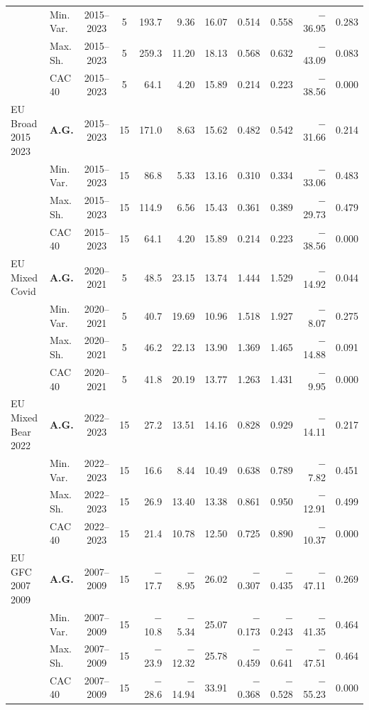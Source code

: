 \begin{longtable}{p{2.6cm} l c c r r r r r r r}
 & Min.\,Var. & 2015--2023 & 5 & 193.7 & 9.36 & 16.07 & 0.514 & 0.558 & $-$36.95 & 0.283 \\
 & Max.\,Sh. & 2015--2023 & 5 & 259.3 & 11.20 & 18.13 & 0.568 & 0.632 & $-$43.09 & 0.083 \\
 & CAC 40 & 2015--2023 & 5 & 64.1 & 4.20 & 15.89 & 0.214 & 0.223 & $-$38.56 & 0.000 \\
\midrule
EU Broad 2015 2023 & \textbf{A.G.} & 2015--2023 & 15 & 171.0 & 8.63 & 15.62 & 0.482 & 0.542 & $-$31.66 & 0.214 \\
 & Min.\,Var. & 2015--2023 & 15 & 86.8 & 5.33 & 13.16 & 0.310 & 0.334 & $-$33.06 & 0.483 \\
 & Max.\,Sh. & 2015--2023 & 15 & 114.9 & 6.56 & 15.43 & 0.361 & 0.389 & $-$29.73 & 0.479 \\
 & CAC 40 & 2015--2023 & 15 & 64.1 & 4.20 & 15.89 & 0.214 & 0.223 & $-$38.56 & 0.000 \\
\midrule
EU Mixed Covid & \textbf{A.G.} & 2020--2021 & 5 & 48.5 & 23.15 & 13.74 & 1.444 & 1.529 & $-$14.92 & 0.044 \\
 & Min.\,Var. & 2020--2021 & 5 & 40.7 & 19.69 & 10.96 & 1.518 & 1.927 & $-$8.07 & 0.275 \\
 & Max.\,Sh. & 2020--2021 & 5 & 46.2 & 22.13 & 13.90 & 1.369 & 1.465 & $-$14.88 & 0.091 \\
 & CAC 40 & 2020--2021 & 5 & 41.8 & 20.19 & 13.77 & 1.263 & 1.431 & $-$9.95 & 0.000 \\
\midrule
EU Mixed Bear 2022 & \textbf{A.G.} & 2022--2023 & 15 & 27.2 & 13.51 & 14.16 & 0.828 & 0.929 & $-$14.11 & 0.217 \\
 & Min.\,Var. & 2022--2023 & 15 & 16.6 & 8.44 & 10.49 & 0.638 & 0.789 & $-$7.82 & 0.451 \\
 & Max.\,Sh. & 2022--2023 & 15 & 26.9 & 13.40 & 13.38 & 0.861 & 0.950 & $-$12.91 & 0.499 \\
 & CAC 40 & 2022--2023 & 15 & 21.4 & 10.78 & 12.50 & 0.725 & 0.890 & $-$10.37 & 0.000 \\
\midrule
EU GFC 2007 2009 & \textbf{A.G.} & 2007--2009 & 15 & $-$17.7 & $-$8.95 & 26.02 & $-$0.307 & $-$0.435 & $-$47.11 & 0.269 \\
 & Min.\,Var. & 2007--2009 & 15 & $-$10.8 & $-$5.34 & 25.07 & $-$0.173 & $-$0.243 & $-$41.35 & 0.464 \\
 & Max.\,Sh. & 2007--2009 & 15 & $-$23.9 & $-$12.32 & 25.78 & $-$0.459 & $-$0.641 & $-$47.51 & 0.464 \\
 & CAC 40 & 2007--2009 & 15 & $-$28.6 & $-$14.94 & 33.91 & $-$0.368 & $-$0.528 & $-$55.23 & 0.000 \\

\end{longtable}
